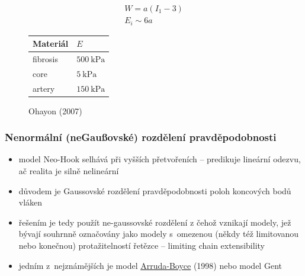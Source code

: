 \begin{align*}
	W = a (I_1 - 3)\\
	E_i \sim 6 a
\end{align*}

\begin{figure}[H]\centering\begin{tabular}{ll}\toprule
	Materiál & $E$\\ \midrule
	fibrosis & $\SI{500}{\kilo\pascal}$\\
	core & $\SI{5}{\kilo\pascal}$\\
	artery & $\SI{150}{\kilo\pascal}$\\
\bottomrule\end{tabular}\caption{Ohayon (2007)}\end{figure}

\subsubsection{Nenormální (neGaußovské) rozdělení pravděpodobnosti}
\begin{itemize}
	\item model Neo-Hook selhává při vyšších přetvořeních -- predikuje lineární odezvu, ač realita je silně nelineární
	\item důvodem je Gaussovské rozdělení pravděpodobnosti poloh koncových bodů vláken
	\item řešením je tedy použít ne-gaussovské rozdělení z čehož vznikají modely, jež bývají souhrnně označovány jako modely s~omezenou (někdy též limitovanou nebo konečnou) protažitelností řetězce -- limiting chain extensibility
	\item jedním z~nejznámějších je model \hyperref[sec:arruda-boyce]{Arruda-Boyce} (1998) nebo model Gent
\end{itemize}
